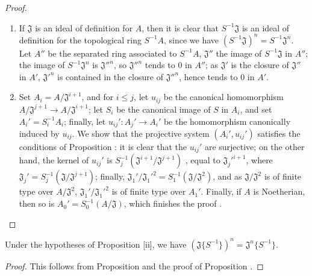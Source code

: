 \begin{proof}
\label{proof-7.6.11}
\medskip\noindent
\begin{enumerate}[label=(\roman*)]
  \item If $\mathfrak{J}$ is an ideal of definition for $A$, then it is clear that
    $S^{-1}\mathfrak{J}$ is an ideal of definition for the topological ring $S^{-1}A$, since we
    have $(S^{-1}\mathfrak{J})^n=S^{-1}\mathfrak{J}^n$. Let $A''$ be the separated ring associated
    to $S^{-1}A$, $\mathfrak{J}''$ the image of $S^{-1}\mathfrak{J}$ in $A''$; the image of
    $S^{-1}\mathfrak{J}^n$ is ${\mathfrak{J}''}^n$, so ${\mathfrak{J}''}^n$ tends to $0$ in $A''$;
    as $\mathfrak{J}'$ is the closure of $\mathfrak{J}''$ in $A'$, ${\mathfrak{J}'}^n$ is contained
    in the closure of ${\mathfrak{J}''}^n$, hence tends to $0$ in $A'$.
  \item Set $A_i=A/\mathfrak{J}^{i+1}$, and for $i\leq j$, let $u_{ij}$ be the canonical
    homomorphism $A/\mathfrak{J}^{j+1}\to A/\mathfrak{J}^{i+1}$; let $S_i$ be the canonical image of
    $S$ in $A_i$, and set $A_i'=S_i^{-1}A_i$; finally, let $u_{ij}':A_j'\to A_i'$ be the homomorphism
    canonically induced by $u_{ij}$. We show that the projective system $(A_i',u_{ij}')$ satisfies
    the conditions of Proposition : it is clear that the $u_{ij}'$
    are surjective; on the other hand, the kernel of $u_{ij}'$ is
    $S_j^{-1}(\mathfrak{J}^{i+1}/\mathfrak{J}^{j+1})$ , equal to
    ${\mathfrak{J}_j'}^{i+1}$, where $\mathfrak{J}_j'=S_j^{-1}(\mathfrak{J}/\mathfrak{J}^{j+1})$;
    finally, $\mathfrak{J}_1'/{\mathfrak{J}_1'}^2=S_1^{-1}(\mathfrak{J}/\mathfrak{J}^2)$, and as
    $\mathfrak{J}/\mathfrak{J}^2$ is of finite type over $A/\mathfrak{J}^2$,
    $\mathfrak{J}_1'/{\mathfrak{J}_1'}^2$ is of finite type over $A_1'$. Finally, if $A$ is
    Noetherian, then so is $A_0'=S_0^{-1}(A/\mathfrak{J})$, which finishes the proof .
\end{enumerate}
\end{proof}

\begin{corollary}[7.6.12]
\label{0.7.6.12}
Under the hypotheses of Proposition [ii], we have
$(\mathfrak{J}\{S^{-1}\})^n=\mathfrak{J}^n\{S^{-1}\}$.
\end{corollary}

\begin{proof}
\label{proof-0.7.6.12}
This follows from Proposition  and the proof of
Proposition .
\end{proof}

